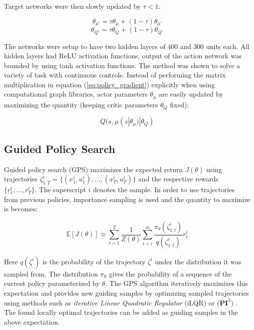 Target networks were then slowly updated by $\tau < 1$:

\begin{equation}
    \theta_{\mu'} = \tau \theta_{\mu} + (1 - \tau) \theta_{\mu'}
\end{equation}
\begin{equation}
    \theta_{Q'} = \tau \theta_{Q} + (1 - \tau) \theta_{Q'}
\end{equation}

The networks were setup to have two hidden layers of $400$ and $300$ units
each.  All hidden layers had ReLU activation functions, output of the action
network was bounded by using tanh activation functions. The method was shown to
solve a variety of task with continuous controls. Instead of performing the
matrix multiplication in equation (\ref{eq:policy_gradient}) explicitly when
using computational graph libraries, actor parameters $\theta_\mu$ are easily updated by
maximizing the quantity (keeping critic parameters $\theta_Q$ fixed):

\begin{equation}
    Q(s, \mu(s|\theta_\mu)|\theta_Q)
\end{equation}

\subsection{Guided Policy Search}

Guided policy search (GPS) \cite{levine2013guided} maximizes the expected
return $J(\theta)$ using trajectories $\zeta^i_{1:T} = \{(x_1^i, u_1^i), ...,
(x_T^i, u_T^i)\}$ and the respective rewards $\{r_1^i, ..., r_T^i\}$. The
superscript $i$ denotes the sample. In order to use trajectories from previous
policies, importance sampling is used and the quantity to maximize is becomes:

\begin{equation}
    \mathbb{E}[J(\theta)] \approx \sum_{t=1}^T \frac{1}{Z(\theta)} \sum_{i=i}^m \frac{\pi_\theta(\zeta^i_{1:t})}{q(\zeta^i_{1:t})}r_t^i
\end{equation}

Here $q(\zeta^i)$ is the probability of the trajectory $\zeta^i$ under the
distribution it was sampled from. The distribution $\pi_\theta$ gives the
probability of a sequence of the current policy parameterized by $\theta$. The
GPS algorithm iteratively maximizes this expectation and provides new guiding
samples by optimizing sampled trajectories using methods such as
\textit{iterative Linear Quadratic Regulator} (iLQR) \cite{tassa2012synthesis}
or  ($\mathbf{PI}^2$)
\cite{theodorou2010generalized}. The found locally optimal trajectories can be
added as guiding samples in the above expectation.

